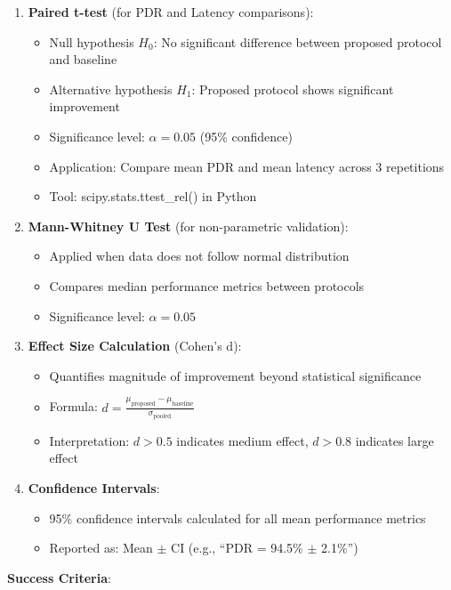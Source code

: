 \begin{enumerate}
\item \textbf{Paired t-test} (for PDR and Latency comparisons):
\begin{itemize}
\item Null hypothesis $H_0$: No significant difference between proposed protocol and baseline
\item Alternative hypothesis $H_1$: Proposed protocol shows significant improvement
\item Significance level: $\alpha = 0.05$ (95\% confidence)
\item Application: Compare mean PDR and mean latency across 3 repetitions
\item Tool: scipy.stats.ttest\_rel() in Python
\end{itemize}

\item \textbf{Mann-Whitney U Test} (for non-parametric validation):
\begin{itemize}
\item Applied when data does not follow normal distribution
\item Compares median performance metrics between protocols
\item Significance level: $\alpha = 0.05$
\end{itemize}

\item \textbf{Effect Size Calculation} (Cohen's d):
\begin{itemize}
\item Quantifies magnitude of improvement beyond statistical significance
\item Formula: $d = \frac{\mu_{\text{proposed}} - \mu_{\text{baseline}}}{\sigma_{\text{pooled}}}$
\item Interpretation: $d > 0.5$ indicates medium effect, $d > 0.8$ indicates large effect
\end{itemize}

\item \textbf{Confidence Intervals}:
\begin{itemize}
\item 95\% confidence intervals calculated for all mean performance metrics
\item Reported as: Mean $\pm$ CI (e.g., ``PDR = 94.5\% $\pm$ 2.1\%'')
\end{itemize}
\end{enumerate}

\textbf{Success Criteria}:

